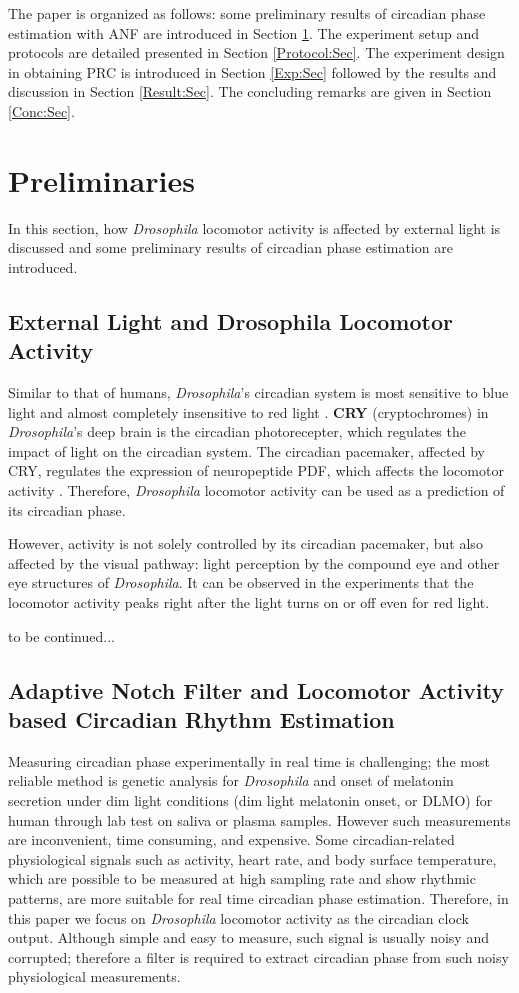\documentclass[11pt, onecolumn]{IEEEtran}
\begin{document}
The paper is organized as follows: some preliminary results of circadian phase estimation with ANF are introduced in Section \ref{Pre:Sec}. The experiment setup and protocols are detailed presented in Section \ref{Protocol:Sec}. The experiment design in obtaining PRC is introduced in Section \ref{Exp:Sec} followed by the results and discussion in Section \ref{Result:Sec}. The concluding remarks are given in Section \ref{Conc:Sec}.

\section{Preliminaries}\label{Pre:Sec}
In this section, how \emph{Drosophila} locomotor activity is affected by external light is discussed and some preliminary results of circadian phase estimation are introduced.
\subsection{External Light and Drosophila Locomotor Activity}
Similar to that of humans, \emph{Drosophila}'s circadian system is most sensitive to blue light and almost completely insensitive to red light \cite{Frank69,Klarsfeld03}. \textbf{CRY} (cryptochromes) in \emph{Drosophila}'s deep brain is the circadian photorecepter, which regulates the impact of light on the circadian system. The circadian pacemaker, affected by CRY, regulates the expression of neuropeptide PDF, which affects the locomotor activity \cite{Emery00}. Therefore, \emph{Drosophila} locomotor activity can be used as a prediction of its circadian phase.

However, activity is not solely controlled by its circadian pacemaker, but also affected by the visual pathway: light perception by the compound eye and other eye structures of \emph{Drosophila}. It can be observed in the experiments that the locomotor activity peaks right after the light turns on or off even for red light.

to be continued...

\subsection{Adaptive Notch Filter and Locomotor Activity based Circadian Rhythm Estimation}\label{ANF:Sec}
Measuring circadian phase experimentally in real time is challenging; the most reliable method is genetic analysis for \emph{Drosophila} and onset of melatonin secretion under dim light conditions (dim light melatonin onset, or DLMO) for human through lab test on saliva or plasma samples. However such measurements are inconvenient, time consuming, and expensive. Some circadian-related physiological signals such as activity, heart rate, and body surface temperature, which are possible to be measured at high sampling rate and show rhythmic patterns, are more suitable for real time circadian phase estimation. Therefore, in this paper we focus on \emph{Drosophila} locomotor activity as the circadian clock output. Although simple and easy to measure, such signal is usually noisy and corrupted; therefore a filter is required to extract circadian phase from such noisy physiological measurements.
\end{document}
